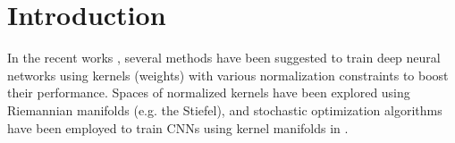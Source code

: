 \documentclass[10pt,journal,compsoc]{IEEEtran}
\theoremstyle{definition}
\theoremstyle{definition}
\theoremstyle{remark}
\theoremstyle{remark}
\theoremstyle{remark}
\begin{document}
\section{Introduction}
\label{intro}


In the recent works  \cite{unit_evol,norm_prop,parseval,Henaff,Huang_2017_ICCV,icml2015_huanga15,SNN,IGAN,w_norm,AAAI1714830}, several methods have been suggested to train deep neural networks using kernels (weights) with various normalization constraints to boost their performance. Spaces of normalized kernels have been explored using Riemannian manifolds (e.g. the Stiefel), and stochastic optimization algorithms have been employed to train CNNs using kernel manifolds in \cite{RBN,haaai,huang162,oo16}. %



	 
	
\end{document}
